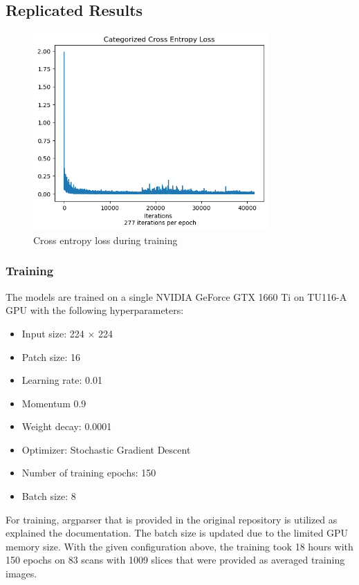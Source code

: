 \documentclass{IEEEtran}
\begin{document}
\subsection{Replicated Results}

\begin{figure}[h]
\centering
\includegraphics[width=0.8\textwidth]{img/celoss.png}
\caption{Cross entropy loss during training}\label{fig:celoss}
\end{figure}

\subsubsection{Training}
The models are trained on a single NVIDIA GeForce GTX 1660 Ti on TU116-A GPU
with the following hyperparameters:
\begin{itemize}
    \item Input size: 224 $\times$ 224
    \item Patch size: 16
    \item Learning rate: 0.01
    \item Momentum 0.9 
    \item Weight decay: 0.0001
    \item Optimizer: Stochastic Gradient Descent
    \item Number of training epochs: 150
    \item Batch size: 8
\end{itemize} 
For training, argparser that is provided in the original repository is utilized as explained the documentation. The batch size is updated due to the limited GPU memory size. With the given configuration above, the training took 18 hours with 150 epochs on 83 scans with 1009 slices that were provided as averaged training images. 
\end{document}
